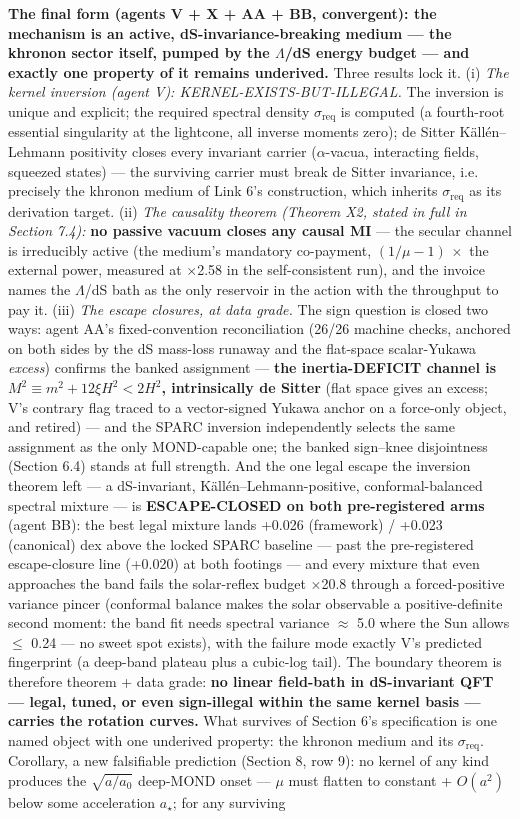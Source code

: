 \documentclass[11pt,a4paper]{article}
\begin{document}
\textbf{The final form (agents V + X + AA + BB, convergent): the mechanism is an active, dS-invariance-breaking medium --- the khronon sector itself, pumped by the $\Lambda$/dS energy budget --- and exactly one property of it remains underived.} Three results lock it. (i) \emph{The kernel inversion (agent V): KERNEL-EXISTS-BUT-ILLEGAL.} The inversion is unique and explicit; the required spectral density $\sigma_{\mathrm{req}}$ is computed (a fourth-root essential singularity at the lightcone, all inverse moments zero); de Sitter K\"all\'en--Lehmann positivity closes every invariant carrier ($\alpha$-vacua, interacting fields, squeezed states) --- the surviving carrier must break de Sitter invariance, i.e. precisely the khronon medium of Link 6's construction, which inherits $\sigma_{\mathrm{req}}$ as its derivation target. (ii) \emph{The causality theorem (Theorem X2, stated in full in Section 7.4):} \textbf{no passive vacuum closes any causal MI} --- the secular channel is irreducibly active (the medium's mandatory co-payment, $(1/\mu - 1)\,\times$ the external power, measured at $\times$2.58 in the self-consistent run), and the invoice names the $\Lambda$/dS bath as the only reservoir in the action with the throughput to pay it. (iii) \emph{The escape closures, at data grade.} The sign question is closed two ways: agent AA's fixed-convention reconciliation (26/26 machine checks, anchored on both sides by the dS mass-loss runaway and the flat-space scalar-Yukawa \emph{excess}) confirms the banked assignment --- \textbf{the inertia-DEFICIT channel is $M^2 \equiv m^2 + 12\xi H^2 < 2H^2$, intrinsically de Sitter} (flat space gives an excess; V's contrary flag traced to a vector-signed Yukawa anchor on a force-only object, and retired) --- and the SPARC inversion independently selects the same assignment as the only MOND-capable one; the banked sign--knee disjointness (Section 6.4) stands at full strength. And the one legal escape the inversion theorem left --- a dS-invariant, K\"all\'en--Lehmann-positive, conformal-balanced spectral mixture --- is \textbf{ESCAPE-CLOSED on both pre-registered arms} (agent BB): the best legal mixture lands +0.026 (framework) / +0.023 (canonical) dex above the locked SPARC baseline --- past the pre-registered escape-closure line (+0.020) at both footings --- and every mixture that even approaches the band fails the solar-reflex budget $\times$20.8 through a forced-positive variance pincer (conformal balance makes the solar observable a positive-definite second moment: the band fit needs spectral variance $\approx$ 5.0 where the Sun allows $\le$ 0.24 --- no sweet spot exists), with the failure mode exactly V's predicted fingerprint (a deep-band plateau plus a cubic-log tail). The boundary theorem is therefore theorem + data grade: \textbf{no linear field-bath in dS-invariant QFT --- legal, tuned, or even sign-illegal within the same kernel basis --- carries the rotation curves.} What survives of Section 6's specification is one named object with one underived property: the khronon medium and its $\sigma_{\mathrm{req}}$. Corollary, a new falsifiable prediction (Section 8, row 9): no kernel of any kind produces the $\sqrt{a/a_0}$ deep-MOND onset --- $\mu$ must flatten to constant + $O(a^2)$ below some acceleration $a_\star$; for any surviving 
\end{document}
